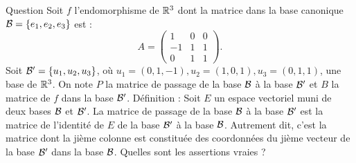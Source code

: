 \begin{multi}[multiple,feedback=
{Soit \(E\) est un espace vectoriel, de dimension finie, muni de deux bases \({\cal B}\) et \({\cal B}'\) et \(f\) un endomorphisme de \(E\). On note \(P\) la matrice de passage de la base \({\cal B}\) à la base \({\cal B}'\), \(A\) la matrice de \(f\) dans la base \({\cal B}\) et \(B\) la matrice de \(f\) dans la base \({\cal B}'\). Alors \(AP=PB\). De cette relation, on déduit que \(A^n=PB^nP^{-1}\). Par définition, on a :
\[P= \left(\begin{array}{rcc}
0&1&0\\1&0&1\\ -1&1&1\end{array}\right) \Rightarrow P^{-1}= \frac{1}{2}\left(\begin{array}{rcc}
1&1&-1\\2&0&0\\ 
-1&1&1\end{array}\right).\]
On vérifie aussi que \(B=\left(\begin{array}{rcc}0&0&0\\0&1&0\\ 
0&0&2\end{array}\right)\). D'où \(A^n= \left(\begin{array}{rcc}
1&0&0\\-2^{n-1}&2^{n-1}&2^{n-1}\\ 
1-2^{n-1}&2^{n-1}&2^{n-1}\end{array}\right)\), pour tout entier \(n\ge1\).
}]{Question}
Soit \(f\) l'endomorphisme de \(\mathbb{R}^3\) dont la matrice dans la base canonique \({\cal B}=\{e_1,e_2,e_3\}\) est : 
\[A=\left(\begin{array}{rcc}1&0&0\\ -1&1&1\\ 
0&1&1 \end{array}\right).\]
Soit \({\cal B}' = \{u_1, u_2,  u_3\}\), où  \(u_1=(0,1,-1), u_2=(1,0,1), u_3=(0,1,1)\), une base de  \(\mathbb{R}^3\). On note \(P\) la matrice de passage de la base \({\cal B}\) à la base \({\cal B}'\) et \(B\) la matrice de \(f\) dans la base \({\cal B}'\).
\vskip0mm
Définition : Soit \(E\) un espace vectoriel muni de deux bases \({\cal {B}}\) et \({\cal {B}}'\). La matrice de passage de la base \({\cal {B}}\) à la base  \({\cal {B}}'\) est la matrice de l'identité de \(E\) de la base \({\cal {B}}'\) à la base  \({\cal {B}}\). Autrement dit, c'est la matrice dont la jième colonne est constituée des coordonnées du jième vecteur de la base \({\cal {B}'}\) dans la base  \({\cal {B}}\).
\vskip0mm
Quelles sont les assertions vraies ?


\end{multi}
